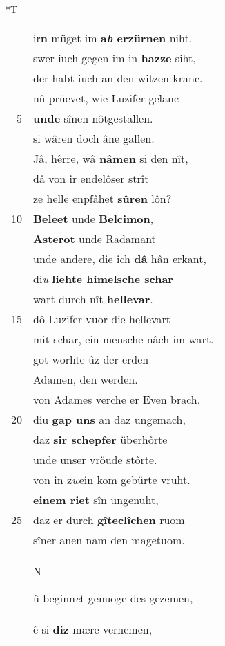 \documentclass[8pt,a4paper,notitlepage]{article}
\begin{document}
\begin{table}[ht]
\begin{minipage}[t]{0.5\linewidth}
\small
\begin{center}*T
\end{center}
\begin{tabular}{rl}
 & ir\textbf{n} müget im \textbf{a\textit{b} erzürnen} niht.\\ 
 & swer iuch gegen im in \textbf{hazze} siht,\\ 
 & der habt iuch an den witzen kranc.\\ 
 & nû prüevet, wie Luzifer gelanc\\ 
5 & \textbf{unde} sînen nôtgestallen.\\ 
 & si wâren doch âne gallen.\\ 
 & Jâ, hêrre, wâ \textbf{nâmen} si den nît,\\ 
 & dâ von ir endelôser strît\\ 
 & ze helle enpfâhet \textbf{sûren} lôn?\\ 
10 & \textbf{Beleet} unde \textbf{Belcimon},\\ 
 & \textbf{Asterot} unde Radamant\\ 
 & unde andere, die ich \textbf{dâ} hân erkant,\\ 
 & di\textit{u} \textbf{liehte himelsche schar}\\ 
 & wart durch nît \textbf{hellevar}.\\ 
15 & dô Luzifer vuor die hellevart\\ 
 & mit schar, ein mensche nâch im wart.\\ 
 & got worhte ûz der erden\\ 
 & Adamen, den werden.\\ 
 & von Adames verche er Even brach.\\ 
20 & diu \textbf{gap uns} an daz ungemach,\\ 
 & daz \textbf{sir schepfer} überhôrte\\ 
 & unde unser vröude stôrte.\\ 
 & von in z\textit{w}ein kom gebürte vruht.\\ 
 & \textbf{einem riet} sîn ungenuht,\\ 
25 & daz er durch \textbf{gîteclîchen} ruom\\ 
 & sîner anen nam den magetuom.\\ 
 & \begin{large}N\end{large}û beginn\textit{e}t genuoge des gezemen,\\ 
 & ê si \textbf{diz} mære vernemen,\\ 

\end{tabular}
\end{minipage}
\end{table}
\end{document}
